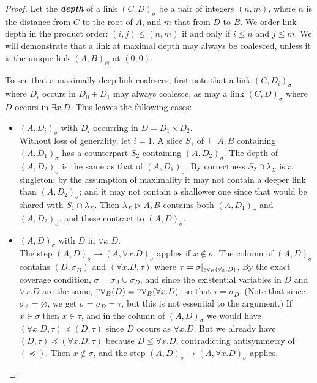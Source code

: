 \documentclass[UKenglish]{lipics-v2016}
\theoremstyle{plain}
\newcommand\defn[1]{\textit{\textbf{#1}}}
\newcommand\ex[2][{}]{\textsc{ev}_{#1}(#2)}
\newcommand\+{+}
\renewcommand\*{\times}
\newcommand\sub{\leq}
\newcommand\dep{\preccurlyeq}
\newcommand\seq[3][]{{\vdash_{#1}}#2,#3}
\newcommand\net[3]{#1\triangleright #2,#3}
\newcommand\res[1]{|_{#1}}
\newcommand\link[3][\sigma]{(#2,#3)_{#1}}
\newcommand\scoal{\rightarrow} %
\begin{document}
\begin{proof}
Let the \defn{depth} of a link $\link CD$ be a pair of integers $(n,m)$, where $n$ is the distance from $C$ to the root of $A$, and $m$ that from $D$ to $B$. We order link depth in the product order: $(i,j)\leq(n,m)$ if and only if $i\leq n$ and $j\leq m$. We will demonstrate that a link at maximal depth may always be coalesced, unless it is the unique link $\link[\varnothing]AB$ at $(0,0)$. 

To see that a maximally deep link coalesces, first note that a link $\link C{D_i}$ where $D_i$ occurs in $D_0{\+}D_1$ may always coalesce, as may a link $\link CD$ where $D$ occurs in $\exists x.D$. This leaves the following cases:
\begin{itemize}
	\item 
$\link A{D_i}$ with $D_i$ occurring in $D=D_1\*D_2$.
\\ 
Without loss of generality, let $i=1$. A slice $S_1$ of $\seq AB$ containing $\link A{D_1}$ has a counterpart $S_2$ containing $\link A{D_2}$. The depth of $\link A{D_2}$ is the same as that of $\link A{D_1}$. By correctness $S_2\cap \lambda_\Sigma$ is a singleton; by the assumption of maximality it may not contain a deeper link than $\link A{D_2}$; and it may not contain a shallower one since that would be shared with $S_1\cap\lambda_\Sigma$. Then $\net{\lambda_\Sigma}AB$ contains both $\link A{D_1}$ and $\link A{D_2}$, and these contract to $\link AD$.
	
	\item 
$\link AD$ with $D$ in $\forall x.D$. 
\\
The step $\link AD\scoal\link A{\forall x.D}$ applies if $x\notin\sigma$. The column of $\link AD$ contains $(D,\sigma_D)$ and $(\forall x.D,\tau)$ where $\tau=\sigma\res{\ex[B]{\forall x.D}}$. By the exact coverage condition, $\sigma=\sigma_A\cup\sigma_D$, and since the existential variables in $D$ and $\forall x.D$ are the same, $\ex[B]D=\ex[B]{\forall x.D}$, so that $\tau=\sigma_D$. (Note that since $\sigma_A=\varnothing$, we get $\sigma=\sigma_D=\tau$, but this is not essential to the argument.) If $x\in\sigma$ then $x\in\tau$, and in the column of $\link AD$ we would have $(\forall x.D,\tau)\dep(D,\tau)$ since $D$ occurs as $\forall x.D$. But we already have $(D,\tau)\dep(\forall x.D,\tau)$ because $D\sub\forall x.D$, contradicting antisymmetry of $(\dep)$. Then $x\notin\sigma$, and the step $\link AD\scoal\link A{\forall x.D}$ applies.


\end{itemize}
\end{proof}
\end{document}
